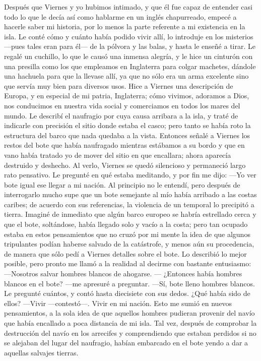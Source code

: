 \documentclass{novela}
\begin{document}
    Después que Viernes y yo hubimos intimado, y que él fue capaz de entender casi todo lo que le decía así como hablarme en un inglés chapurreado, empecé a hacerle saber mi historia, por lo menos la parte referente a mi existencia en la isla. Le conté cómo y cuánto había podido vivir allí, lo introduje en los misterios —pues tales eran para él— de la pólvora y las balas, y hasta le enseñé a tirar. Le regalé un cuchillo, lo que le causó una inmensa alegría, y le hice un cinturón con una presilla como los que empleamos en Inglaterra para colgar machetes, dándole una hachuela para que la llevase allí, ya que no sólo era un arma excelente sino que servía muy bien para diversos usos.
    Hice a Viernes una descripción de Europa, y en especial de mi patria, Inglaterra; cómo vivimos, adoramos a Dios, nos conducimos en nuestra vida social y comerciamos en todos los mares del mundo. Le describí el naufragio por cuya causa arribara a la isla, y traté de indicarle con precisión el sitio donde estaba el casco; pero tanto se había roto la estructura del barco que nada quedaba a la vista.
    Entonces señalé a Viernes los restos del bote que había naufragado mientras estábamos a su bordo y que en vano había tratado yo de mover del sitio en que encallara; ahora aparecía destruido y deshecho. Al verlo, Viernes se quedó silencioso y permaneció largo rato pensativo. Le pregunté en qué estaba meditando, y por fin me dijo:
    —Yo ver bote igual ese llegar a mi nación.
    Al principio no le entendí, pero después de interrogarlo mucho supe que un bote semejante al mío había arribado a las costas caribes; de acuerdo con sus referencias, la violencia de un temporal lo precipitó a tierra. Imaginé de inmediato que algún barco europeo se habría estrellado cerca y que el bote, soltándose, había llegado solo y vacío a la costa; pero tan ocupado estaba en estos pensamientos que no cruzó por mi mente la idea de que algunos tripulantes podían haberse salvado de la catástrofe, y menos aún su procedencia, de manera que sólo pedí a Viernes detalles sobre el bote.
    Lo describió lo mejor posible, pero pronto me llamó a la realidad al decirme con bastante entusiasmo:
    —Nosotros salvar hombres blancos de ahogarse.
    — ¿Entonces había hombres blancos en el bote? —me apresuré a preguntar.
    —Sí, bote lleno hombres blancos.
    Le pregunté cuántos, y contó hasta diecisiete con sus dedos. ¿Qué había sido de ellos?
    —Vivir —contestó—. Vivir en mi nación.
    Esto me sumió en nuevos pensamientos, a la sola idea de que aquellos hombres pudieran provenir del navío que había encallado a poca distancia de mi isla. Tal vez, después de comprobar la destrucción del navío en los arrecifes y comprendiendo que estaban perdidos si no se alejaban del lugar del naufragio, habían embarcado en el bote yendo a dar a aquellas salvajes tierras.
\end{document}
